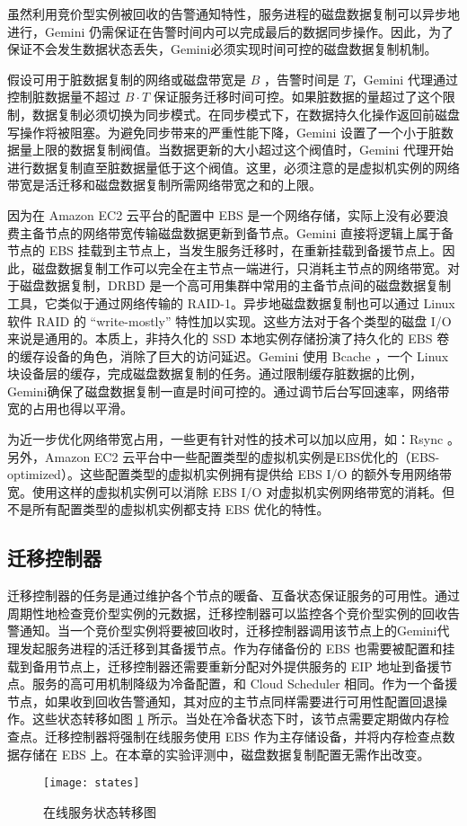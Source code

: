 虽然利用竞价型实例被回收的告警通知特性，服务进程的磁盘数据复制可以异步地进行，Gemini 仍需保证在告警时间内可以完成最后的数据同步操作。因此，为了保证不会发生数据状态丢失，Gemini必须实现时间可控的磁盘数据复制机制。

假设可用于脏数据复制的网络或磁盘带宽是 $B$ ，告警时间是 $T$，Gemini 代理通过控制脏数据量不超过 $B \cdot T$ 保证服务迁移时间可控。如果脏数据的量超过了这个限制，数据复制必须切换为同步模式。在同步模式下，在数据持久化操作返回前磁盘写操作将被阻塞。为避免同步带来的严重性能下降，Gemini 设置了一个小于脏数据量上限的数据复制阀值。当数据更新的大小超过这个阀值时，Gemini 代理开始进行数据复制直至脏数据量低于这个阀值。这里，必须注意的是虚拟机实例的网络带宽是活迁移和磁盘数据复制所需网络带宽之和的上限。

因为在 Amazon EC2 云平台的配置中 EBS 是一个网络存储，实际上没有必要浪费主备节点的网络带宽传输磁盘数据更新到备节点。Gemini 直接将逻辑上属于备节点的 EBS 挂载到主节点上，当发生服务迁移时，在重新挂载到备援节点上。因此，磁盘数据复制工作可以完全在主节点一端进行，只消耗主节点的网络带宽。对于磁盘数据复制，DRBD \cite{DRBD:2015} 是一个高可用集群中常用的主备节点间的磁盘数据复制工具，它类似于通过网络传输的 RAID-1。异步地磁盘数据复制也可以通过 Linux 软件 RAID \cite{Linux_md:2016} 的 ``write-mostly'' 特性加以实现。这些方法对于各个类型的磁盘 I/O 来说是通用的。本质上，非持久化的 SSD 本地实例存储扮演了持久化的 EBS 卷的缓存设备的角色，消除了巨大的访问延迟。Gemini 使用 Bcache \cite{Bcache:2016}，一个 Linux 块设备层的缓存，完成磁盘数据复制的任务。通过限制缓存脏数据的比例，Gemini确保了磁盘数据复制一直是时间可控的。通过调节后台写回速率，网络带宽的占用也得以平滑。

为近一步优化网络带宽占用，一些更有针对性的技术可以加以应用，如：Rsync \cite{Rsync:2016}。另外，Amazon EC2 云平台中一些配置类型的虚拟机实例是EBS优化的（EBS-optimized）。这些配置类型的虚拟机实例拥有提供给 EBS I/O 的额外专用网络带宽。使用这样的虚拟机实例可以消除 EBS I/O 对虚拟机实例网络带宽的消耗。但不是所有配置类型的虚拟机实例都支持 EBS 优化的特性。

\subsection{迁移控制器}
迁移控制器的任务是通过维护各个节点的暖备、互备状态保证服务的可用性。通过周期性地检查竞价型实例的元数据，迁移控制器可以监控各个竞价型实例的回收告警通知。当一个竞价型实例将要被回收时，迁移控制器调用该节点上的Gemini代理发起服务进程的活迁移到其备援节点。作为存储备份的 EBS 也需要被配置和挂载到备用节点上，迁移控制器还需要重新分配对外提供服务的 EIP 地址到备援节点。服务的高可用机制降级为冷备配置，和 Cloud Scheduler \cite{He:2015:CCH:2749246.2749275} 相同。作为一个备援节点，如果收到回收告警通知，其对应的主节点同样需要进行可用性配置回退操作。这些状态转移如图 \ref{figure:states} 所示。当处在冷备状态下时，该节点需要定期做内存检查点。迁移控制器将强制在线服务使用 EBS 作为主存储设备，并将内存检查点数据存储在 EBS 上。在本章的实验评测中，磁盘数据复制配置无需作出改变。
\begin{figure}[]
  \centering
  \texttt{[image: states]}
  \caption{在线服务状态转移图}
  \label{figure:states}
\end{figure}

